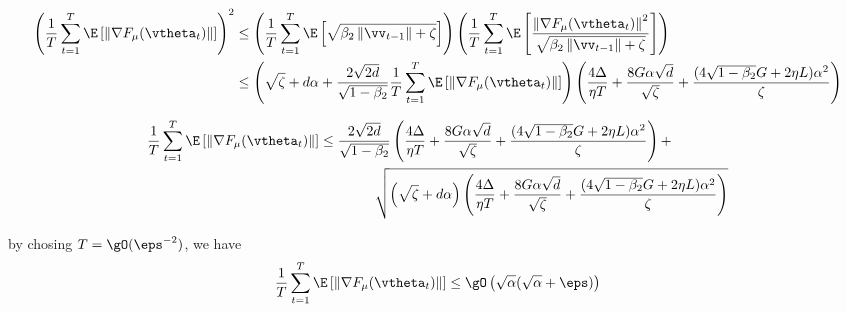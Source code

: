\begin{equation}
\begin{aligned}
\left(\frac{1}{T}\sum_{t=1}^T\E\left[\left\|\nabla
F_{\mu}(\vtheta_t)\right\|\right]\right)^2 &\leq \left(\frac{1}{T}\sum_{t=1}^T \E\left[\sqrt{\beta_2\left\|\vv_{t-1}\right\|+\zeta}\right]\right)\left(\frac{1}{T}\sum_{t=1}^T\E\left[\frac{\left\|\nabla
F_{\mu}(\vtheta_t)\right\|^2}{\sqrt{\beta_2\left\|\vv_{t-1}\right\|+\zeta}}\right]\right) \\
&\leq \left(\sqrt{\zeta} + d\alpha + \frac{2\sqrt{2d}}{\sqrt{1-\beta_2}}\frac{1}{T}\sum_{t=1}^T\E\left[\left\|\nabla
F_{\mu}(\vtheta_t)\right\|\right]\right)\left(\frac{4\Delta}{\eta T} + \frac{8G\alpha\sqrt{d}}{\sqrt{\zeta}} +  \frac{(4\sqrt{1-\beta_2}G + 2\eta L)\alpha^2}{\zeta}\right)
\end{aligned}
\end{equation}

\begin{equation}
\begin{aligned}
\frac{1}{T}\sum_{t=1}^T\E\left[\left\|\nabla
F_{\mu}(\vtheta_t)\right\|\right] &\leq \frac{2\sqrt{2d}}{\sqrt{1-\beta_2}}\left(\frac{4\Delta}{\eta T} + \frac{8G\alpha\sqrt{d}}{\sqrt{\zeta}} +  \frac{(4\sqrt{1-\beta_2}G + 2\eta L)\alpha^2}{\zeta}\right) + \\
&\qquad \qquad \sqrt{\left(\sqrt{\zeta} + d\alpha\right)\left(\frac{4\Delta}{\eta T} + \frac{8G\alpha\sqrt{d}}{\sqrt{\zeta}} +  \frac{(4\sqrt{1-\beta_2}G + 2\eta L)\alpha^2}{\zeta}\right)} 
\end{aligned}
\end{equation}

by chosing $T=\gO(\eps^{-2})$, we have
\begin{equation}
\frac{1}{T}\sum_{t=1}^T\E\left[\left\|\nabla
F_{\mu}(\vtheta_t)\right\|\right] \leq \gO\left(\sqrt{\alpha}(\sqrt{\alpha} + \eps)\right)
\end{equation}



